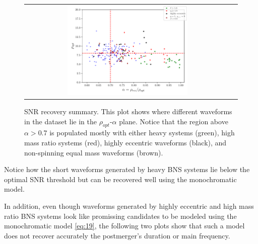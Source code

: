 \begin{figure}[hbt!]
\begin{center}
\begin{tabular}{cc}
\includegraphics[width=0.6\textwidth, angle=0]{images/Data_analysis/results/alpha_sum0.pdf}
\end{tabular}
\captionsetup{width=0.8\textwidth}
\caption[SNR recovery summary]
{SNR recovery summary. This plot shows where different waveforms in the dataset lie in the $\rho_{opt}$-$\alpha$ plane. Notice that the region above $\alpha>0.7$ is populated mostly with either heavy systems (green), high mass ratio systems (red),  highly eccentric waveforms (black), and non-spinning equal mass waveforms (brown).}
\label{1}
\end{center}
\end{figure}
\FloatBarrier

\newpage
Notice how the short waveforms generated by heavy BNS systems lie below the optimal SNR threshold but can be recovered well using the monochromatic model.

In addition, even though waveforms generated by highly eccentric and high mass ratio BNS systems look like promissing candidates to be modeled using the monochromatic model \ref{eq:19}, the following two plots show that such a model does not recover accurately the postmerger's duration or main frequency.

